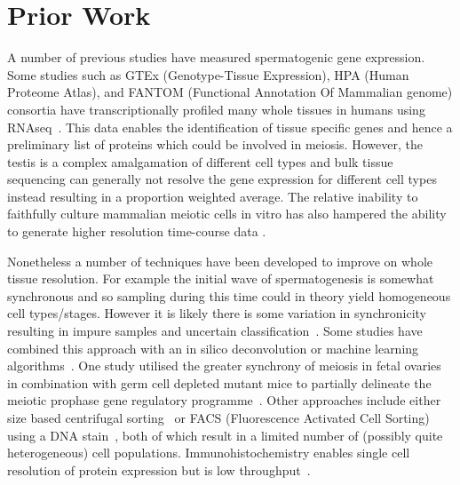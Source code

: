 \section{Prior Work}

A number of previous studies have measured spermatogenic gene expression.
Some studies such as GTEx (Genotype-Tissue Expression), HPA (Human Proteome Atlas), and FANTOM (Functional Annotation Of Mammalian genome) consortia have transcriptionally profiled many whole tissues in humans using RNAseq~\parencite{Mele2015Human,Uhlen2015Tissuebased,Uhlen2016Transcriptomics}.
This data enables the identification of tissue specific genes and hence a preliminary list of proteins which could be involved in meiosis.
 However, the testis is a complex amalgamation of different cell types and bulk tissue sequencing can generally not resolve the gene expression for different cell types instead resulting in a proportion weighted average.
The relative inability to faithfully culture mammalian meiotic cells in vitro has also hampered the ability to generate higher resolution time-course data \parencite{Zhou2016Complete, Hikabe2016Reconstitution}.

Nonetheless a number of techniques have been developed to improve on whole tissue resolution.
For example the initial wave of spermatogenesis is somewhat synchronous and so sampling during this time could in theory yield homogeneous cell types/stages.
However it is likely there is some variation in synchronicity resulting in impure samples and uncertain classification~\parencite{Laiho2013Transcriptome,Ball2016Regulatory}.
Some studies have combined this approach with an in silico deconvolution or machine learning algorithms~\parencite{Margolin2014Integrated,Li2013Identification}.
One study utilised the greater synchrony of meiosis in fetal ovaries in combination with germ cell depleted mutant mice to partially delineate the meiotic prophase gene regulatory programme~\parencite{Soh2015Gene}.
Other approaches include either size based centrifugal sorting~\parencite{Soumillon2013Cellular,Buard2009Distinct,Grabske1975Centrifugal} or FACS (Fluorescence Activated Cell Sorting) using a DNA stain~\parencite{daCruz2016Transcriptome}, both of which result in a limited number of (possibly quite heterogeneous) cell populations.
Immunohistochemistry enables single cell resolution of protein expression but is low throughput~\parencite{Djureinovic2014human}.


